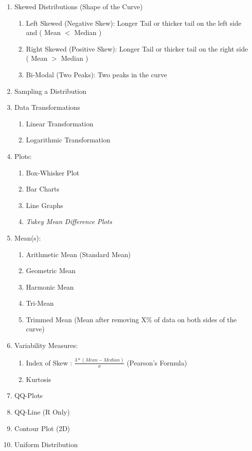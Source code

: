 \documentclass[11pt]{article}
\begin{document}
\begin{enumerate}
		\item Skewed Distributions (Shape of the Curve)
		\begin{enumerate}
			\item Left Skewed (Negative Skew): Longer Tail or thicker tail on the left side and ( Mean $<$ Median )
			\item Right Skewed (Positive Skew): Longer Tail or thicker tail on the right side ( Mean $>$ Median )
			\item Bi-Modal (Two Peaks): Two peaks in the curve
		\end{enumerate}
		\item Sampling a Distribution
		\item Data Transformations
		\begin{enumerate}
			\item Linear Transformation
			\item Logarithmic Transformation
		\end{enumerate}
		\item Plots:
		\begin{enumerate}
			\item Box-Whisker Plot
			\item Bar Charts
			\item Line Graphs
			\item \textit{Tukey Mean Difference Plots}
		\end{enumerate}
		\item Mean(s):
		\begin{enumerate}
			\item Arithmetic Mean (Standard Mean)
			\item Geometric Mean
			\item Harmonic Mean
			\item Tri-Mean
			\item Trimmed Mean (Mean after removing X\%  of data on both sides of the curve)
		\end{enumerate}
		\item Variability Measures:
		\begin{enumerate}
			\item Index of Skew :  $ \frac{3 * ( Mean - Median )}{ \sigma }$ (Pearson's Formula)
			\item Kurtosis
		\end{enumerate}
		\item QQ-Plots
		\item QQ-Line (R Only)
		\item Contour Plot (2D)
		\item Uniform Distribution

\end{enumerate}
\end{document}
